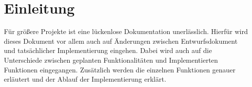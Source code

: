 \chapter{Einleitung}
    \begin{flushleft}
        Für größere Projekte ist eine lückenlose Dokumentation unerlässlich. Hierfür wird dieses Dokument vor allem auch auf Änderungen zwischen Entwurfsdokument und tatsächlicher Implementierung eingehen. Dabei wird auch auf die Unterschiede zwischen geplanten Funktionalitäten und Implementierten Funktionen eingegangen. Zusätzlich werden die einzelnen Funktionen genauer erläutert und der Ablauf der Implementierung erklärt.\newline
        
    \end{flushleft}
    
